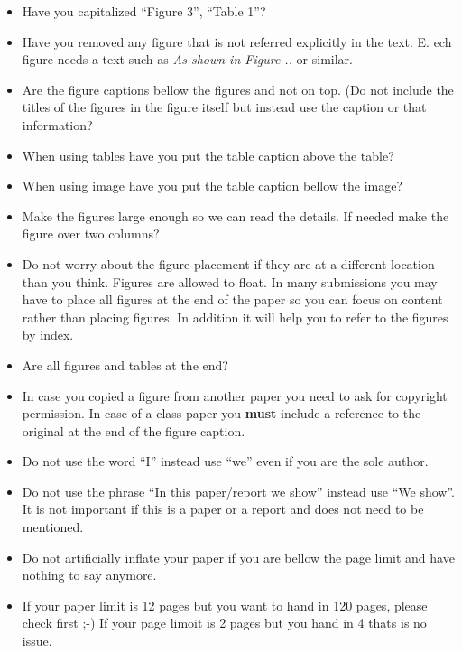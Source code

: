 \begin{itemize}[label=$\Box$]
\item Have you capitalized ``Figure 3'', ``Table 1''?

\item Have you removed any figure that is not referred explicitly in
  the text. E. ech figure needs a text such as  {\em As shown in
    Figure ..} or similar.

\item Are the figure captions bellow the figures and not on top. (Do
  not include the titles of the figures in the figure itself but
  instead use the caption or that information?

\item When using tables have you put the table caption above the table?

\item When using image have you put the table caption bellow the image?

\item Make the figures large enough so we can read the details. If
  needed make the figure over two columns? 

\item Do not worry about the figure placement if they are at a
  different location than you think. Figures are allowed to float. In
  many submissions you may have to place all figures at the end of the
  paper so you can focus on content rather than placing figures. In
  addition it will help you to refer to the figures by index.

\item Are all figures and tables at the end?

\item In case you copied a figure from another paper you need to ask
  for copyright permission. In case of a class paper you \textbf{must}
  include a reference to the original at the end of the figure caption.

\item Do not use the word ``I'' instead use ``we'' even if you are the
  sole author.

\item Do not use the phrase ``In this paper/report we show'' instead
  use ``We show''. It is not important if this is a paper or a report
  and does not need to be mentioned.

\item Do not artificially inflate your paper if you are bellow the
  page limit and have nothing to say anymore.

\item If your paper limit is 12 pages but you want to hand in 120
  pages, please check first ;-) If your page limoit is 2 pages but you
  hand in 4 thats is no issue.


\end{itemize}
